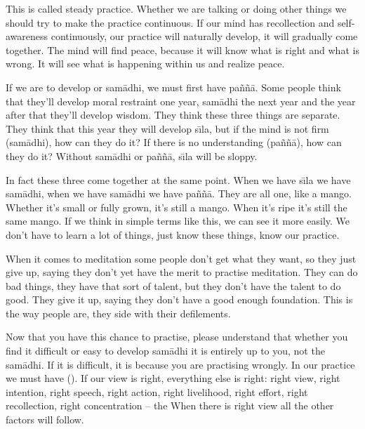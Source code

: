 This is called steady practice. Whether we are talking or doing other things we should try to make the practice continuous. If our mind has recollection and self-awareness continuously, our practice will naturally develop, it will gradually come together. The mind will find peace, because it will know what is right and what is wrong. It will see what is happening within us and realize peace.

If we are to develop  or sam\=adhi, we must first have pa\~n\~n\=a. Some people think that they'll develop moral restraint one year, sam\=adhi the next year and the year after that they'll develop wisdom. They think these three things are separate. They think that this year they will develop s\={\i}la, but if the mind is not firm (sam\=adhi), how can they do it? If there is no understanding (pa\~n\~n\=a), how can they do it? Without sam\=adhi or pa\~n\~n\=a, s\={\i}la will be sloppy.

In fact these three come together at the same point. When we have s\={\i}la we have sam\=adhi, when we have sam\=adhi we have pa\~n\~n\=a. They are all one, like a mango. Whether it's small or fully grown, it's still a mango. When it's ripe it's still the same mango. If we think in simple terms like this, we can see it more easily. We don't have to learn a lot of things, just know these things, know our practice.

When it comes to meditation some people don't get what they want, so they just give up, saying they don't yet have the merit to practise meditation. They can do bad things, they have that sort of talent, but they don't have the talent to do good. They give it up, saying they don't have a good enough foundation. This is the way people are, they side with their defilements.

Now that you have this chance to practise, please understand that whether you find it difficult or easy to develop sam\=adhi it is entirely up to you, not the sam\=adhi. If it is difficult, it is because you are practising wrongly. In our practice we must have  (). If our view is right, everything else is right: right view, right intention, right speech, right action, right livelihood, right effort, right recollection, right concentration -- the  When there is right view all the other factors will follow.

